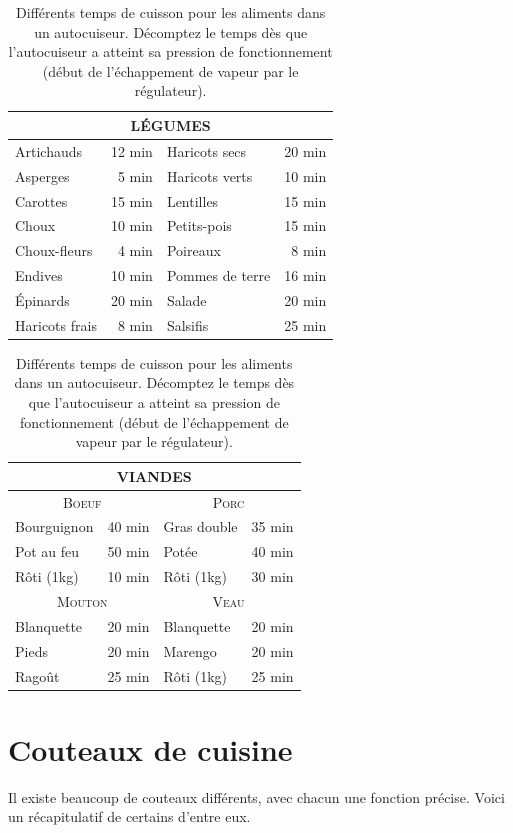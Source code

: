 \documentclass[a4paper,twoside,openright]{report}
\begin{document}
\begin{table}[htb]
\centering
\begin{tabular}{|l|r||l|r|}
\hline
\multicolumn{4}{|c|}{\textbf{LÉGUMES}}\\\hline
Artichauds & 12 min & Haricots secs & 20 min\\\hline
Asperges & 5 min & Haricots verts & 10 min\\\hline
Carottes & 15 min & Lentilles & 15 min\\\hline
Choux & 10 min & Petits-pois & 15 min\\\hline
Choux-fleurs & 4 min & Poireaux & 8 min\\\hline
Endives & 10 min & Pommes de terre & 16 min\\\hline
Épinards & 20 min & Salade & 20 min\\\hline
Haricots frais & 8 min & Salsifis & 25 min\\\hline
\end{tabular}

\bigskip

\begin{tabular}{|l|r||l|r|}
\hline
\multicolumn{4}{|c|}{\textbf{VIANDES}}\\\hline
\multicolumn{2}{|c||}{\textsc{Boeuf}} & \multicolumn{2}{c|}{\textsc{Porc}}\\\hline
Bourguignon & 40 min & Gras double & 35 min\\\hline
Pot au feu & 50 min & Potée & 40 min\\\hline
Rôti (1kg) & 10 min & Rôti (1kg) & 30 min\\\hline
\multicolumn{2}{|c||}{\textsc{Mouton}} & \multicolumn{2}{c|}{\textsc{Veau}}\\\hline
Blanquette & 20 min & Blanquette & 20 min\\\hline
Pieds & 20 min & Marengo & 20 min\\\hline
Ragoût & 25 min & Rôti (1kg) & 25 min\\\hline
\end{tabular}

\caption{Différents temps de cuisson pour les aliments dans un autocuiseur. Décomptez le temps dès que l'autocuiseur a atteint sa pression de fonctionnement (début de l'échappement de vapeur par le régulateur).}\label{tab:cuisson_autocuiseur}
\end{table}

\section{Couteaux de cuisine}
Il existe beaucoup de couteaux différents, avec chacun une fonction précise. Voici un récapitulatif de certains d'entre eux.
\end{document}
